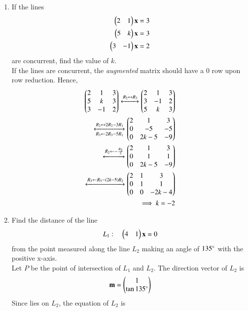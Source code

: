 \begin{enumerate}[label=\arabic*.,ref=\thesubsection.\theenumi]
\item If the lines 
\begin{align}
\begin{pmatrix}2 & 1\end{pmatrix}\mathbf{x}  = 3
\\
\begin{pmatrix}5 & k\end{pmatrix}\mathbf{x}  = 3
\\
\begin{pmatrix}3 & -1\end{pmatrix}\mathbf{x}  = 2
\end{align}
%
are concurrent, find the value of $k$.
%
\\
\solution If the lines are concurrent, the {\em augmented}  matrix should have a 0 row upon row reduction.  Hence, 
%
\begin{align}
\begin{pmatrix}
2 & 1 & 3
\\
5 & k & 3
\\
3 & -1 & 2
\end{pmatrix}
\xleftrightarrow{R_2\leftrightarrow R_3}
\begin{pmatrix}
2 & 1 & 3
\\
3 & -1 & 2
\\
5 & k & 3
\end{pmatrix}
\\
\xleftrightarrow [R_3\leftarrow 2R_3-5R_1]{R_2\leftrightarrow 2R_2-3R_1}
\begin{pmatrix}
2 & 1 & 3
\\
0 & -5 & -5
\\
0 & 2k-5 & -9
\end{pmatrix}
\\
\xleftrightarrow []{R_2\leftarrow -\frac{R_2}{5}}
\begin{pmatrix}
2 & 1 & 3
\\
0 & 1 & 1
\\
0 & 2k-5 & -9
\end{pmatrix}
\\
\xleftrightarrow []{R_3\leftarrow R_3-\ensuremath{\left(2k-5\right)}R_2}
\begin{pmatrix}
2 & 1 & 3
\\
0 & 1 & 1
\\
0 & 0 & -2k-4
\end{pmatrix}
\\
\implies k = -2
\end{align}
%
\item Find the distance of the line
\begin{align}
\label{eq:line_L_1}
L_1: \quad \begin{pmatrix}4 & 1\end{pmatrix}\mathbf{x}  = 0
\end{align}
%
from the point  measured along the line $L_2$ making an angle of $135\degree$ with the positive x-axis.
%
\\
\solution  Let $P$ be the point of intersection of $L_1$ and $L_2$.  The direction vector of $L_2$ is 
\begin{align}
\mathbf{m} = \begin{pmatrix}1 \\ \tan 135\degree\end{pmatrix}
\end{align}
%
Since  lies on $L_2$, the equation of $L_2$ is 
\begin{align}
\label{eq:line_L_2}

\end{align}
\end{enumerate}
